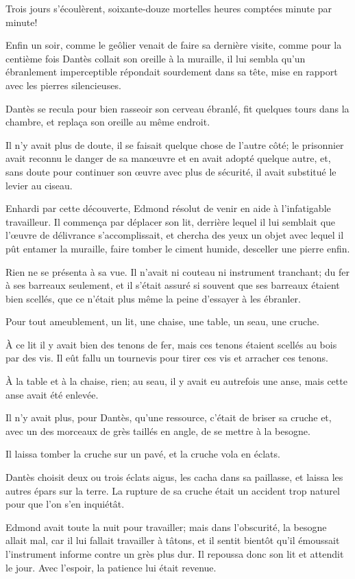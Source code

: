 Trois jours s'écoulèrent, soixante-douze mortelles heures comptées minute par minute!

Enfin un soir, comme le geôlier venait de faire sa dernière visite, comme pour la centième fois Dantès collait son oreille à la muraille, il lui sembla qu'un ébranlement imperceptible répondait sourdement dans sa tête, mise en rapport avec les pierres silencieuses.

Dantès se recula pour bien rasseoir son cerveau ébranlé, fit quelques tours dans la chambre, et replaça son oreille au même endroit.

Il n'y avait plus de doute, il se faisait quelque chose de l'autre côté; le prisonnier avait reconnu le danger de sa manœuvre et en avait adopté quelque autre, et, sans doute pour continuer son œuvre avec plus de sécurité, il avait substitué le levier au ciseau.

Enhardi par cette découverte, Edmond résolut de venir en aide à l'infatigable travailleur. Il commença par déplacer son lit, derrière lequel il lui semblait que l'œuvre de délivrance s'accomplissait, et chercha des yeux un objet avec lequel il pût entamer la muraille, faire tomber le ciment humide, desceller une pierre enfin.

Rien ne se présenta à sa vue. Il n'avait ni couteau ni instrument tranchant; du fer à ses barreaux seulement, et il s'était assuré si souvent que ses barreaux étaient bien scellés, que ce n'était plus même la peine d'essayer à les ébranler.

Pour tout ameublement, un lit, une chaise, une table, un seau, une cruche.

À ce lit il y avait bien des tenons de fer, mais ces tenons étaient scellés au bois par des vis. Il eût fallu un tournevis pour tirer ces vis et arracher ces tenons.

À la table et à la chaise, rien; au seau, il y avait eu autrefois une anse, mais cette anse avait été enlevée.

Il n'y avait plus, pour Dantès, qu'une ressource, c'était de briser sa cruche et, avec un des morceaux de grès taillés en angle, de se mettre à la besogne.

Il laissa tomber la cruche sur un pavé, et la cruche vola en éclats.

Dantès choisit deux ou trois éclats aigus, les cacha dans sa paillasse, et laissa les autres épars sur la terre. La rupture de sa cruche était un accident trop naturel pour que l'on s'en inquiétât.

Edmond avait toute la nuit pour travailler; mais dans l'obscurité, la besogne allait mal, car il lui fallait travailler à tâtons, et il sentit bientôt qu'il émoussait l'instrument informe contre un grès plus dur. Il repoussa donc son lit et attendit le jour. Avec l'espoir, la patience lui était revenue.

